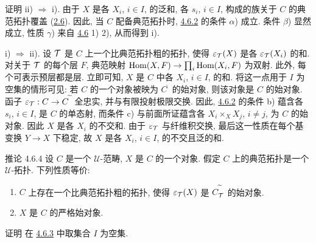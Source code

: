 \begin{enonce*}[remark]{证明}
ii) $\Rightarrow$ i).
由于 $X$ 是各 $X_i$, $i\in I$, 的泛和,
各 $s_i$, $i\in I$, 构成的族关于 $C$ 的典范拓扑覆盖
(\hyperref[II.prop2.6]{2.6}).
因此, 当 $C$ 配备典范拓扑时,
\hyperref[II.cor4.6.2]{4.6.2} 的条件 $\alpha$) 成立.
条件 $\beta$) 显然成立,
性质 $\gamma$) 来自 \hyperref[II.prop4.6]{4.6} 1) 2), 从而得到 i).

\noindent i) $\Rightarrow$ ii).
设 ${\mathcal T}$ 是 $C$ 上一个比典范拓扑粗的拓扑,
使得 $\varepsilon_{\mathcal T}(X)$ 是各 $\varepsilon_{\mathcal T}(X_i)$ 的和.
对关于 ${\mathcal T}$ 的每个层 $F$,
典范映射 $\operatorname{Hom}(X,F)\rightarrow\prod_i\operatorname{Hom}(X_i,F)$ 为双射.
此外, 每个可表示预层都是层.
立即可知, $X$ 是 $C$ 中各 $X_i$, $i\in I$, 的和.
将这一点用于 $I$ 为空集的情形可见:
若 $C$ 的一个对象被映为 $C^{\widetilde{\phantom{,}}}$ 的始对象,
则该对象是 $C$ 的始对象.
函子 $\varepsilon_{\mathcal T}:C\rightarrow C^{\widetilde{\phantom{,}}}$
全忠实, 并与有限投射极限交换.
因此, \hyperref[II.cor4.6.2]{4.6.2} 的条件 b) 蕴含各 $s_i$,
$i\in I$, 是 $C$ 的单态射,
而条件 c) 与前面所证蕴含各 $X_i\times_XX_j$, $i\neq j$,
为 $C$ 的始对象.
因此 $X$ 是各\pageoriginale{} $X_i$ 的不交和.
由于 $\varepsilon_{\mathcal T}$ 与纤维积交换,
最后这一性质在每个基变换 $Y\rightarrow X$ 下稳定,
故 $X$ 是各 $X_i$, $i\in I$, 的不交且泛的和.
\end{enonce*}

\begin{enonce*}{推论 4.6.4}
设 $C$ 是一个 $𝒰$-范畴, $X$ 是 $C$ 的一个对象.
假定 $C$ 上的典范拓扑是一个 $𝒰$-拓扑.
下列性质等价:
\begin{enumerate}
\renewcommand{\theenumi}{\roman{enumi}}
\renewcommand{\labelenumi}{\theenumi)}
\item $C$ 上存在一个比典范拓扑粗的拓扑,
使得 $\varepsilon_{\mathcal T}(X)$ 是 $C^{\widetilde{\phantom{,}}}_{\mathcal T}$ 的始对象.

\item $X$ 是 $C$ 的严格始对象.
\end{enumerate}
\end{enonce*}

\begin{enonce*}[remark]{证明}
在 \hyperref[II.cor4.6.3]{4.6.3} 中取集合 $I$ 为空集.
\end{enonce*}

